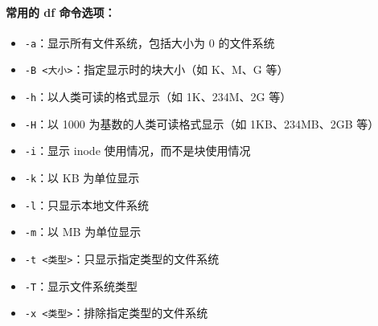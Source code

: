 \documentclass[12pt,UTF8]{ctexbook}
\begin{document}
\paragraph{常用的 df 命令选项：}
\begin{itemize}
    \item \verb+-a+：显示所有文件系统，包括大小为 0 的文件系统
    \item \verb+-B <大小>+：指定显示时的块大小（如 K、M、G 等）
    \item \verb+-h+：以人类可读的格式显示（如 1K、234M、2G 等）
    \item \verb+-H+：以 1000 为基数的人类可读格式显示（如 1KB、234MB、2GB 等）
    \item \verb+-i+：显示 inode 使用情况，而不是块使用情况
    \item \verb+-k+：以 KB 为单位显示
    \item \verb+-l+：只显示本地文件系统
    \item \verb+-m+：以 MB 为单位显示
    \item \verb+-t <类型>+：只显示指定类型的文件系统
    \item \verb+-T+：显示文件系统类型
    \item \verb+-x <类型>+：排除指定类型的文件系统
\end{itemize}
\end{document}

